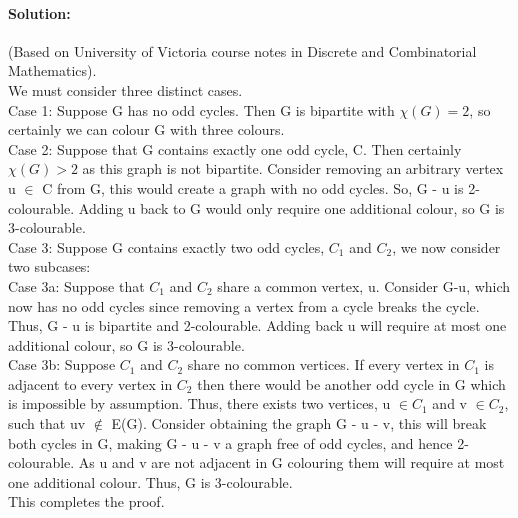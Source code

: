 \documentclass{article}
\begin{document}
\paragraph{Solution:}
(Based on University of Victoria course notes in Discrete and Combinatorial Mathematics).\\

\noindent
We must consider three distinct cases.\\

\noindent
Case 1: Suppose G has no odd cycles. Then G is bipartite with $\chi(G) = 2$, so
certainly we can colour G with three colours.\\

\noindent
Case 2: Suppose that G contains exactly one odd cycle, C. Then certainly
$\chi(G) > 2$ as this graph is not bipartite. Consider removing an arbitrary vertex
u $\in$ C from G, this would create a graph with no odd cycles. So, G - u is
2-colourable. Adding u back to G would only require one additional colour, so G is 3-colourable.\\

\noindent
Case 3: Suppose G contains exactly two odd cycles, $C_1$ and $C_2$, we now consider
two subcases:\\

Case 3a: Suppose that $C_1$ and $C_2$ share a common vertex, u. Consider
G-u, which now has no odd cycles since removing a vertex from
a cycle breaks the cycle. Thus, G - u is bipartite and 2-colourable.
Adding back u will require at most one additional colour, so G is
3-colourable.\\

Case 3b: Suppose $C_1$ and $C_2$ share no common vertices. If every
vertex in $C_1$ is adjacent to every vertex in $C_2$ then there would be
another odd cycle in G which is impossible by assumption. Thus,
there exists two vertices, u $\in C_1$ and v $\in C_2$, such that uv $\notin$ E(G).
Consider obtaining the graph G - u - v, this will break both cycles
in G, making G - u - v a graph free of odd cycles, and hence
2-colourable. As u and v are not adjacent in G colouring them will
require at most one additional colour. Thus, G is 3-colourable.\\

\noindent
This completes the proof.
\end{document}

